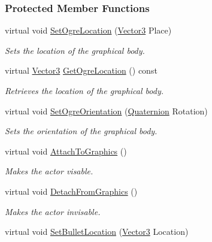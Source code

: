 \subsubsection*{Protected Member Functions}
\begin{DoxyCompactItemize}
\item 
virtual void \hyperlink{classphys_1_1ActorBase_a192ced7c3191f3f9d4921aad73952046}{SetOgreLocation} (\hyperlink{classphys_1_1Vector3}{Vector3} Place)
\begin{DoxyCompactList}\small\item\em Sets the location of the graphical body. \item\end{DoxyCompactList}\item 
virtual \hyperlink{classphys_1_1Vector3}{Vector3} \hyperlink{classphys_1_1ActorBase_a12ef0a2625e2fdf506ea8e23e0a378fa}{GetOgreLocation} () const 
\begin{DoxyCompactList}\small\item\em Retrieves the location of the graphical body. \item\end{DoxyCompactList}\item 
virtual void \hyperlink{classphys_1_1ActorBase_a7b2d13cb1e8bba60eeae782a53fd5e49}{SetOgreOrientation} (\hyperlink{classphys_1_1Quaternion}{Quaternion} Rotation)
\begin{DoxyCompactList}\small\item\em Sets the orientation of the graphical body. \item\end{DoxyCompactList}\item 
virtual void \hyperlink{classphys_1_1ActorBase_a45f190cb9b647bb3385d1298f9dab589}{AttachToGraphics} ()
\begin{DoxyCompactList}\small\item\em Makes the actor visable. \item\end{DoxyCompactList}\item 
virtual void \hyperlink{classphys_1_1ActorBase_acc352d14b6d7f15694ea108ec1c281ec}{DetachFromGraphics} ()
\begin{DoxyCompactList}\small\item\em Makes the actor invisable. \item\end{DoxyCompactList}\item 
virtual void \hyperlink{classphys_1_1ActorBase_aa7ab524d2905e640cea6324cce9ccfdb}{SetBulletLocation} (\hyperlink{classphys_1_1Vector3}{Vector3} Location)

\end{DoxyCompactItemize}
